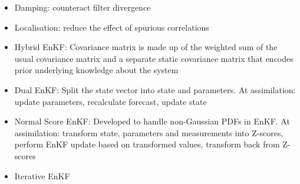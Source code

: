 \begin{itemize}
    \item Damping: counteract filter divergence
    \item Localisation: reduce the effect of spurious correlations
    \item Hybrid EnKF: Covariance matrix is made up of the weighted sum of the
        usual covariance matrix and a separate static covariance matrix that
        encodes prior underlying knowledge about the system
    \item Dual EnKF: Split the state vector into state and parameters. At
        assimilation: update parameters, recalculate forecast, update state
    \item Normal Score EnKF: Developed to handle non-Gaussian PDFs in EnKF. At
        assimilation: transform state, parameters and measurements into
        Z-scores, perform EnKF update based on transformed values, transform
        back from Z-scores
    \item Iterative EnKF
\end{itemize}
